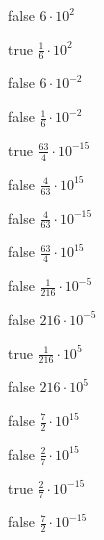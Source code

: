\begin{reponses}
    \item[false] $6\cdot 10^{2}$
    \item[true] $\frac{1}{6}\cdot 10^{2}$
    \item[false] $6\cdot 10^{-2}$
    \item[false] $\frac{1}{6}\cdot 10^{-2}$
\end{reponses}

\begin{question}{1211}{Calcul}{0{{/}
    Que vaut $\frac{4\cdot 10^{-6}\times 7\cdot 10^{7}\times 1\cdot 10^{-1}\times 9\cdot 10^{-3}\times 7\cdot 10^{-10}}{2\cdot 10^{10}\times 8\cdot 10^{-6}\times 7\cdot 10^{-2}}$?
\end{question}

\begin{reponses}
    \item[true] $\frac{63}{4}\cdot 10^{-15}$
    \item[false] $\frac{4}{63}\cdot 10^{15}$
    \item[false] $\frac{4}{63}\cdot 10^{-15}$
    \item[false] $\frac{63}{4}\cdot 10^{15}$
\end{reponses}

\begin{question}{1211}{Calcul}{0{{/}
    Que vaut $\frac{5\cdot 10^{-8}}{6\cdot 10^{-10}\times 5\cdot 10^{-8}\times 6\cdot 10^{4}\times 6\cdot 10^{1}}$?
\end{question}

\begin{reponses}
    \item[false] $\frac{1}{216}\cdot 10^{-5}$
    \item[false] $216\cdot 10^{-5}$
    \item[true] $\frac{1}{216}\cdot 10^{5}$
    \item[false] $216\cdot 10^{5}$
\end{reponses}

\begin{question}{1211}{Calcul}{0{{/}
    Que vaut $\frac{2\cdot 10^{-10}}{7\cdot 10^{5}}$?
\end{question}

\begin{reponses}
    \item[false] $\frac{7}{2}\cdot 10^{15}$
    \item[false] $\frac{2}{7}\cdot 10^{15}$
    \item[true] $\frac{2}{7}\cdot 10^{-15}$
    \item[false] $\frac{7}{2}\cdot 10^{-15}$
\end{reponses}

